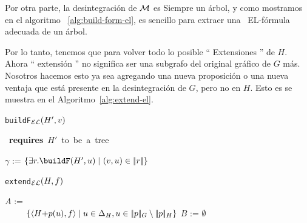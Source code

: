 Por otra parte, la desintegraci\'on de $\mathcal{M}$ es
Siempre un \'arbol, y como mostramos en el algoritmo ~\ref{alg:build-form-el},
es sencillo para extraer una \ EL-f\'ormula adecuada de un \'arbol.

Por lo tanto, tenemos que  para volver todo lo posible
`` Extensiones '' de $ H $. Ahora `` extensi\'on '' no significa ser una
subgrafo del original gr\'afico de $ G $ m\'as. Nosotros hacemos esto
ya sea agregando una nueva proposici\'on o una nueva ventaja
que est\'a presente en la desintegraci\'on de $ G $, pero no en $ H $. Esto es
se muestra en el Algoritmo~\ref{alg:extend-el}.

%
\begin{center}\begin{minipage}{5cm}%
\begin{algorithm}[H] \small
{} \caption{\small
\texttt{buildF}$_\mathcal{EL}(H',v)$}\label{alg:build-form-el} \mbox{{\bf
requires} $H'$ to be a tree}

$\gamma$ := $\cset{\exists r.\buildF(H',u) \mid$

\hfill$ (v,u) \in \interp{r}}$\;

\;
\end{algorithm}
\end{minipage}
\begin{minipage}{7cm}%
\begin{algorithm}[H]\small
{} \caption{\small
\texttt{extend}$_\mathcal{EL}(H,f)$}\label{alg:extend-el}

$A$ :=\\
\ \ \ \ \  $\{\langle H {+} p(u),f \rangle \mid u \in \Delta_H, u \in
|\!|p|\!|_G \setminus |\!|p|\!|_H\}$\; $B$ := $\emptyset$\;
  \;
\end{algorithm}
\end{minipage}
\end{center}
%
